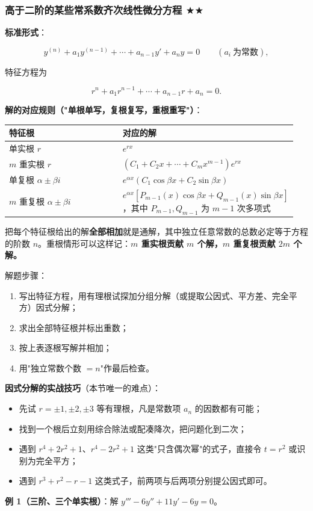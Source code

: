 \documentclass[11pt,openany,UTF8]{ctexbook}
\begin{document}
\subsubsection{高于二阶的某些常系数齐次线性微分方程 $\bigstar$$\bigstar$}

\textbf{标准形式}：

\[y^{(n)}+a_1y^{(n-1)}+\cdots+a_{n-1}y'+a_ny=0\qquad (a_i\ \text{为常数}),\]

特征方程为

\[r^{n}+a_1r^{n-1}+\cdots+a_{n-1}r+a_n=0 .\]

\textbf{解的对应规则（"单根单写，复根复写，重根重写"）}：

\begingroup\small\setlength{\tabcolsep}{4.0pt}
\begin{longtable}{@{}L{0.4844\linewidth}L{0.4613\linewidth}@{}}
\toprule
\textbf{特征根} & \textbf{对应的解} \\
\midrule
\endhead
单实根 $r$ & $e^{rx}$ \\
$m$ 重实根 $r$ & $\left(C_1+C_2x+\cdots+C_mx^{m-1}\right)e^{rx}$ \\
单复根 $\alpha\pm\beta i$ & $e^{\alpha x}\left(C_1\cos\beta x+C_2\sin\beta x\right)$ \\
$m$ 重复根 $\alpha\pm\beta i$ & $e^{\alpha x}\left[P_{m-1}(x)\cos\beta x+Q_{m-1}(x)\sin\beta x\right]$，其中 $P_{m-1},Q_{m-1}$ 为 $m-1$ 次多项式 \\
\bottomrule
\end{longtable}
\endgroup

把每个特征根给出的解\textbf{全部相加}就是通解，其中独立任意常数的总数必定等于方程的阶数 $n$。重根情形可以这样记：\textbf{$m$ 重实根贡献 $m$ 个解，$m$ 重复根贡献 $2m$ 个解。}

解题步骤：

\begin{enumerate}
\item 写出特征方程，用有理根试探加分组分解（或提取公因式、平方差、完全平方）因式分解；
\item 求出全部特征根并标出重数；
\item 按上表逐根写解并相加；
\item 用"独立常数个数 $=n$"作最后检查。
\end{enumerate}
\textbf{因式分解的实战技巧}（本节唯一的难点）：

\begin{itemize}
\item 先试 $r=\pm 1,\pm 2,\pm 3$ 等有理根，凡是常数项 $a_n$ 的因数都有可能；
\item 找到一个根后立刻用综合除法或配凑降次，把问题化到二次；
\item 遇到 $r^{4}+2r^{2}+1$、$r^{4}-2r^{2}+1$ 这类"只含偶次幂"的式子，直接令 $t=r^{2}$ 或识别为完全平方；
\item 遇到 $r^{3}+r^{2}-r-1$ 这类式子，前两项与后两项分别提公因式即可。
\end{itemize}
\textbf{例 1（三阶、三个单实根）}：解 $y'''-6y''+11y'-6y=0$。
\end{document}
